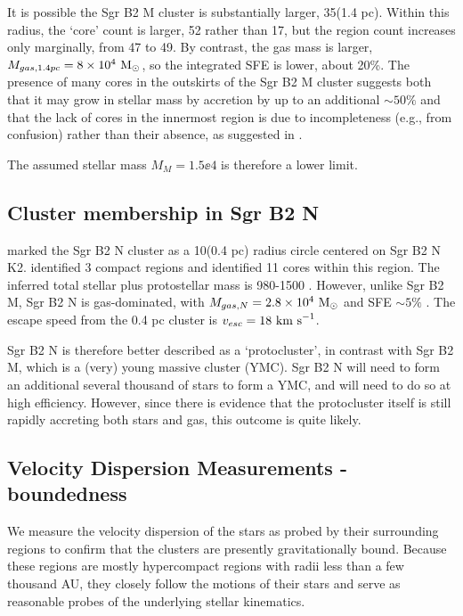 \documentclass[twocolumn]{aastex62}
\begin{document}

It is possible the Sgr B2 M cluster is substantially larger, 35\arcsec (1.4 pc).
Within this radius, the `core' count is larger, 52 rather than 17, but the \hii
region count increases only marginally, from 47 to 49.  By contrast,
the gas mass is larger, $M_{gas,1.4pc} = 8\times10^{4}~\mathrm{M}_{\odot}$, so the integrated SFE is lower,
about 20\%.  
The presence of many cores in the outskirts of the Sgr B2 M cluster suggests
both that it may grow in stellar mass by accretion by up to an additional
$\sim50\%$ and that the lack of cores in the innermost region is due to
incompleteness (e.g., from confusion) rather than their absence, as suggested
in \citet{Ginsburg2018a}.

The assumed stellar mass  $M_M=1.5\ee{4}$ \msun is therefore a lower limit.

\subsection{Cluster membership in Sgr B2 N}
\citet{Schmiedeke2016a} marked the Sgr B2 N cluster as a 10\arcsec  (0.4 pc) radius circle
centered on Sgr B2 N K2.  \citet{Schmiedeke2016a} identified 3 compact \hii regions
and \citet{Ginsburg2018a} identified 11 cores within this region.  The inferred
total stellar plus protostellar mass is 980-1500 \msun.  However, unlike Sgr B2
M, Sgr B2 N is gas-dominated, with $M_{gas,N} = 2.8\times10^{4}~\mathrm{M}_{\odot}$ and SFE
$\sim5\%$ \citep{Schmiedeke2016a}.  The escape speed from the 0.4 pc cluster is
$v_{esc} = 18~\textrm{km~s}^{-1}$.

Sgr B2 N is therefore better described as a `protocluster', in contrast with
Sgr B2 M, which is a (very) young massive cluster (YMC).  Sgr B2 N will need to
form an additional several thousand \msun of stars to form a YMC, and will need
to do so at high efficiency.  However, since there is evidence that the
protocluster itself is still rapidly accreting both stars and gas, this outcome
is quite likely.


\subsection{Velocity Dispersion Measurements - boundedness}
\label{sec:vdisp}
We measure the velocity dispersion of the stars as probed by their surrounding
\hii regions to confirm that the clusters are presently gravitationally bound.
Because these regions are mostly hypercompact \hii regions with radii less than a few
thousand AU, they closely follow the motions of their stars and serve as reasonable
probes of the underlying stellar kinematics.
\end{document}

